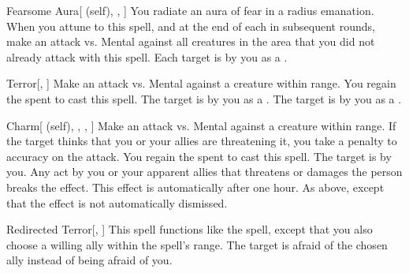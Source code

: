 \lowercase{\hypertarget{spell:Fearsome Aura}{}}\label{spell:Fearsome Aura}
\begin{attuneability}[\nth{1}]{\hypertarget{spell:Fearsome Aura}{Fearsome Aura}}[ (self), , ]
You radiate an aura of fear in a \arealarge radius emanation.
When you attune to this spell, and at the end of each  in subsequent rounds, make an attack vs. Mental against all creatures in the area that you did not already attack with this spell.
\hit Each target is  by you as a .
\end{attuneability}
\vspace{0.25em}



\lowercase{\hypertarget{spell:Terror}{}}\label{spell:Terror}
\begin{apability}[\nth{1}]{\hypertarget{spell:Terror}{Terror}}[, ]
Make an attack vs. Mental against a creature within \rngmed range.
\miss You regain the  spent to cast this spell.
\hit The target is \frightened by you as a .
\crit The target is \panicked by you as a .
\end{apability}
\vspace{0.25em}



\lowercase{\hypertarget{spell:Charm}{}}\label{spell:Charm}
\begin{attuneability}[\nth{2}]{\hypertarget{spell:Charm}{Charm}}[ (self), , , ]
Make an attack vs. Mental against a creature within \rnglong range.
If the target thinks that you or your allies are threatening it, you take a  penalty to accuracy on the attack.
\miss You regain the  spent to cast this spell.
\hit The target is \charmed by you.
Any act by you or your apparent allies that threatens or damages the  person breaks the effect.
This effect is automatically  after one hour.
\crit As above, except that the effect is not automatically dismissed.
\end{attuneability}
\vspace{0.25em}



\lowercase{\hypertarget{spell:Redirected Terror}{}}\label{spell:Redirected Terror}
\begin{apability}[\nth{2}]{\hypertarget{spell:Redirected Terror}{Redirected Terror}}[, ]
This spell functions like the  spell, except that you also choose a willing ally within the spell's range.
The target is afraid of the chosen ally instead of being afraid of you.
\end{apability}
\vspace{0.25em}



